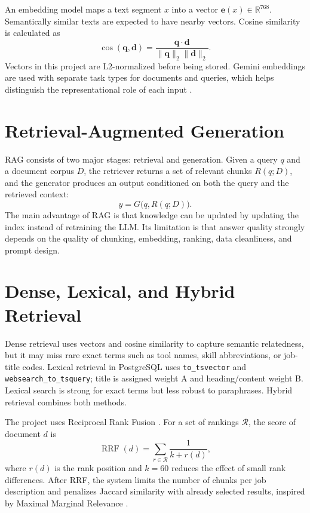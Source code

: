 \documentclass[12pt,a4paper,oneside]{report}
\newcommand{\code}[1]{\texttt{#1}}
\begin{document}
An embedding model maps a text segment $x$ into a vector $\mathbf{e}(x)\in\mathbb{R}^{768}$. Semantically similar texts are expected to have nearby vectors. Cosine similarity is calculated as
\begin{equation}
\operatorname{cos}(\mathbf{q},\mathbf{d})=
\frac{\mathbf{q}\cdot\mathbf{d}}{\lVert\mathbf{q}\rVert_2\lVert\mathbf{d}\rVert_2}.
\label{eq:cosine}
\end{equation}
Vectors in this project are L2-normalized before being stored. Gemini embeddings are used with separate task types for documents and queries, which helps distinguish the representational role of each input \cite{geminiembed}.

\section{Retrieval-Augmented Generation}
RAG consists of two major stages: retrieval and generation. Given a query $q$ and a document corpus $D$, the retriever returns a set of relevant chunks $R(q;D)$, and the generator produces an output conditioned on both the query and the retrieved context:
\begin{equation}
y=G\big(q, R(q;D)\big).
\end{equation}
The main advantage of RAG is that knowledge can be updated by updating the index instead of retraining the LLM. Its limitation is that answer quality strongly depends on the quality of chunking, embedding, ranking, data cleanliness, and prompt design.

\section{Dense, Lexical, and Hybrid Retrieval}
Dense retrieval uses vectors and cosine similarity to capture semantic relatedness, but it may miss rare exact terms such as tool names, skill abbreviations, or job-title codes. Lexical retrieval in PostgreSQL uses \code{to\_tsvector} and \code{websearch\_to\_tsquery}; title is assigned weight A and heading/content weight B. Lexical search is strong for exact terms but less robust to paraphrases. Hybrid retrieval combines both methods.

The project uses Reciprocal Rank Fusion \cite{cormack2009rrf}. For a set of rankings $\mathcal{R}$, the score of document $d$ is
\begin{equation}
\operatorname{RRF}(d)=\sum_{r\in\mathcal{R}}\frac{1}{k+r(d)},
\label{eq:rrf}
\end{equation}
where $r(d)$ is the rank position and $k=60$ reduces the effect of small rank differences. After RRF, the system limits the number of chunks per job description and penalizes Jaccard similarity with already selected results, inspired by Maximal Marginal Relevance \cite{carbonell1998mmr}.
\end{document}
